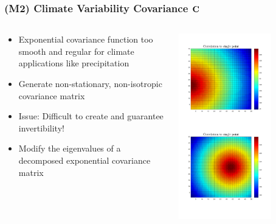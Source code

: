 \documentclass{beamer}
\newcommand{\C}{\ensuremath{\text{Cov}}}
\def\C{\textbf{\text{C}}}
\begin{document}
\begin{frame}
\frametitle{(M2) Climate Variability Covariance $\C$}

\begin{columns}
\begin{column}{0.5\textwidth}
\begin{itemize}
  \item Exponential covariance function too smooth and regular for climate applications like precipitation
  \item {} Generate non-stationary, non-isotropic covariance matrix
  \item \alert{Issue:} Difficult to create and guarantee invertibility!
\item {} Modify the eigenvalues of a decomposed exponential covariance matrix 
\end{itemize}
\end{column}
\begin{column}{0.5\textwidth}
    \begin{center}
     \includegraphics[width=0.7\textwidth]{Images/expoCorrelation.png} 
     \end{center}
\end{column}
\end{columns}

\end{frame}
\end{document}
